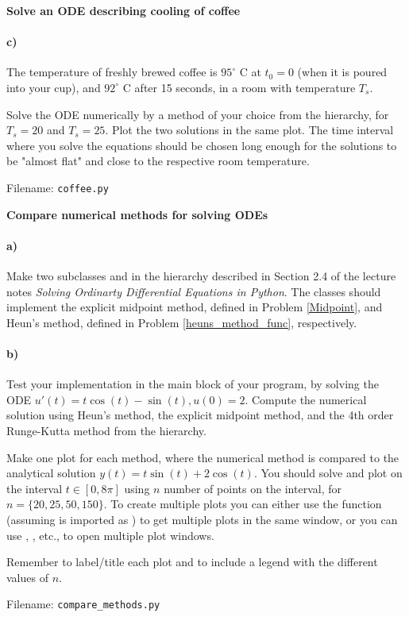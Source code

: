 \begin{Problem}{\textbf{Solve an ODE describing cooling of coffee}}
\paragraph{c)} The temperature of freshly brewed coffee
is $95^{\circ}$ C at $t_0=0$ (when it is poured into your cup),
and $92^{\circ}$ C after 15 seconds, in a room with temperature $T_s$.

Solve the ODE numerically by a method of your choice from the 
hierarchy, for $T_s = 20$ and $T_s = 25$. Plot the two solutions in the same plot.
The time interval where you solve the equations should be chosen long enough
for the solutions to be "almost flat" and close to the respective room temperature.

Filename: \texttt{coffee.py}
\end{Problem}
\newpage

\begin{Problem}{\textbf{Compare numerical methods for solving ODEs}}
\paragraph{a)}Make two subclasses
 and  in the
 hierarchy described in Section 2.4 of the lecture notes
\emph{Solving Ordinarty Differential Equations in Python}. The classes should
implement the explicit midpoint method, defined in Problem \ref{Midpoint}, and Heun's method,
defined in Problem \ref{heuns_method_func}, respectively.

\paragraph{b)}
Test your implementation in the main block of your program, by solving the
ODE $u'(t) = t\cos(t)-\sin(t), u(0) = 2$. Compute the numerical solution using
Heun's method, the explicit midpoint method, and the 4th order Runge-Kutta method
from the  hierarchy.

Make one plot for each method, where the numerical method is compared to the
analytical solution $y(t) = t\sin(t)+2\cos(t)$. You should solve and plot on
the interval $t \in [0, 8\pi]$ using $n$ number of points on the interval,
for $n = \{20,25,50,150\}$. To create multiple plots you can either
use the  function (assuming 
is imported as ) to get multiple plots in the same window, or
you can use , , etc.,
to open multiple plot windows.

Remember to label/title each plot and to include a legend with the different values of $n$.

Filename: \texttt{compare\_methods.py}
\end{Problem}

